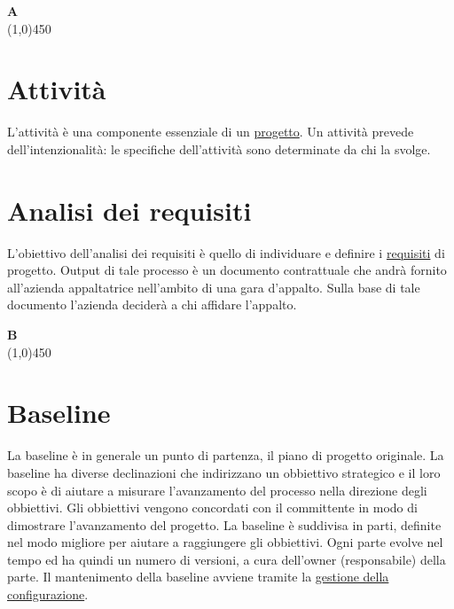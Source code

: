 





\copertina


\tableofcontents

\newpage
	{\Huge{\textbf{A}}} \\
	\line(1,0){450}
	
	\section{Attività}
	\label{sec:attivita}
	L'attività è una componente essenziale di un \hyperref[sec:progetto]{progetto}. Un attività prevede dell'intenzionalità: le specifiche dell'attività sono determinate da chi la svolge. 	
	
	\section{Analisi dei requisiti}
	\label{sec:analisirequisiti}
	L'obiettivo dell'analisi dei requisiti è quello di individuare e definire i \hyperref[sec:requisito]{requisiti} di progetto. Output di tale processo è un documento contrattuale che andrà fornito all'azienda appaltatrice nell'ambito di una gara d'appalto. Sulla base di tale documento l'azienda deciderà a chi affidare l'appalto. \newpage

	{\Huge{\textbf{B}}} \\
	\line(1,0){450}
	
	\section{Baseline}
	\label{sec:baseline}
	La baseline è in generale un punto di partenza, il piano di progetto originale. La baseline ha diverse declinazioni che indirizzano un obbiettivo strategico e il loro scopo è di aiutare a misurare l'avanzamento del processo nella direzione degli obbiettivi. Gli obbiettivi vengono concordati con il committente in modo di dimostrare l'avanzamento del progetto. La baseline è suddivisa in parti, definite nel modo migliore per aiutare a raggiungere gli obbiettivi. Ogni parte evolve nel tempo ed ha quindi un numero di versioni, a cura dell'owner (responsabile) della parte. Il mantenimento della baseline avviene tramite la \hyperref[sec:controlloconfigurazione]{gestione della configurazione}. 
	
